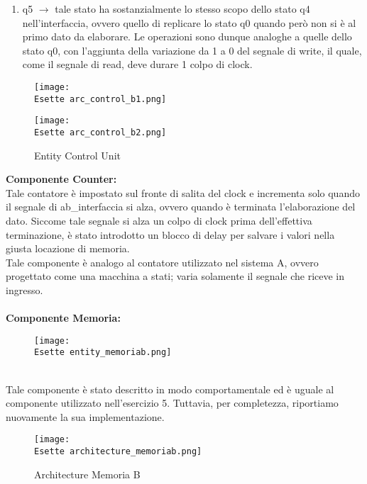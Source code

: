 \documentclass[12pt]{article}
\def \Esette {Allegati/Esercizio7/}
\begin{document}
\begin{enumerate}
    \item q5 $\rightarrow$ tale stato ha sostanzialmente lo stesso scopo dello stato q4 nell’interfaccia, ovvero quello di replicare lo stato q0 quando però non si è al primo dato da elaborare. Le operazioni sono dunque analoghe a quelle dello stato q0, con l’aggiunta della variazione da 1 a 0 del segnale di write, il quale, come il segnale di read, deve durare 1 colpo di clock.
\end{enumerate}
\clearpage
\begin{figure}[ht!]
    \centering
    \texttt{[image: \\Esette arc\_control\_b1.png]}
\end{figure}
\begin{figure}[ht!]
    \centering
    \texttt{[image: \\Esette arc\_control\_b2.png]}
    \caption{Entity Control Unit}
\end{figure}
\clearpage
{\large \textbf{Componente Counter:}}
\\Tale contatore è impostato sul fronte di salita del clock e incrementa solo quando il segnale di ab\_interfaccia si alza, ovvero quando è terminata l’elaborazione del dato. Siccome tale segnale si alza un colpo di clock prima dell’effettiva terminazione, è stato introdotto un blocco di delay per salvare i valori nella giusta locazione di memoria.
\\Tale componente è analogo al contatore utilizzato nel sistema A, ovvero progettato come una macchina a stati; varia solamente il segnale che riceve in ingresso.
\\\\{\large \textbf{Componente Memoria:}}
\begin{figure}[ht!]
    \centering
    \texttt{[image: \\Esette entity\_memoriab.png]}
\end{figure}
\\Tale componente è stato descritto in modo comportamentale ed è uguale al componente utilizzato nell’esercizio 5. Tuttavia, per completezza, riportiamo nuovamente la sua implementazione.
\begin{figure}[ht!]
    \centering
    \texttt{[image: \\Esette architecture\_memoriab.png]}
    \caption{Architecture Memoria B}
\end{figure}
\clearpage
\end{document}
